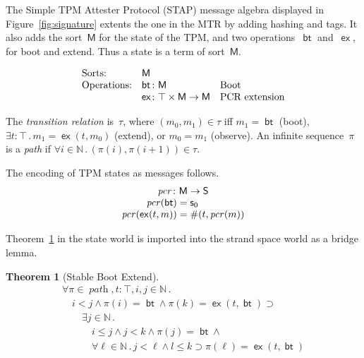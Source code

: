 \documentclass[12pt]{article}
\newtheorem{thm}{Theorem}
\newcommand{\cn}[1]{\ensuremath{\operatorname{\mathsf{#1}}}}
\newcommand{\fn}[1]{\ensuremath{\operatorname{\mathit{#1}}}}
\newcommand{\srt}[1]{\ensuremath{\mathsf{#1}}}
\newcommand{\nat}{\ensuremath{\mathbb{N}}}
\newcommand{\all}[1]{\forall#1\mathpunct.}
\newcommand{\some}[1]{\exists#1\mathpunct.}
\newcommand{\boot}{\cn{bt}}
\newcommand{\tran}{\ensuremath{\tau}}
\newcommand{\pth}{\ensuremath{\pi}}
\begin{document}
The Simple TPM Attester Protocol (STAP) message algebra displayed in
Figure~\ref{fig:signature} extents the one in the MTR by adding
hashing and tags.  It also adds the sort~\srt{M} for the state of the
TPM, and two operations~\cn{bt} and~\cn{ex}, for boot and extend.
Thus a state is a term of sort~\srt{M}.

$$\begin{array}{ll@{{}\colon{}}ll}
\mbox{Sorts:}&\multicolumn{3}{l}{\srt{M}}\\
\mbox{Operations:}&\boot&\srt{M}& \mbox{Boot}\\
&\cn{ex}&\top\times\srt{M}\to\srt{M}&\mbox{PCR extension}
\end{array}$$

The \emph{transition relation} is~$\tran$, where $(m_0,m_1)\in\tran$
iff $m_1=\boot$ (boot), $\some{t\colon\top}m_1=\cn{ex}(t,m_0)$
(extend), or $m_0 = m_1$ (observe).  An infinite sequence~$\pth$ is a
\emph{path} if $\all{i\in\nat}(\pth(i),\pth(i+1))\in\tran$.

The encoding of TPM states as messages follows.
$$\begin{array}{r@{{}={}}l}
\multicolumn{2}{c}{\fn{pcr}\colon\srt{M}\to\srt{S}}\\
\fn{pcr}(\boot)&\cn{s}_0\\
\fn{pcr}(\cn{ex}(t, m))&\#(t,\fn{pcr}(m))
\end{array}$$


Theorem~\ref{thm:stable boot extend} in the state world is
imported into the strand space world as a bridge lemma.
\begin{thm}[Stable Boot Extend]\label{thm:stable boot extend}
$$\begin{array}{l}
\all{\pi\in\fn{path},t\colon\top,i,j\in\nat}\\
\quad i<j\wedge\pi(i)=\boot\wedge\pi(k)=\cn{ex}(t,\boot)\supset{}\\
\qquad\some{j\in\nat}\\
\qquad\quad i\leq j\wedge j<k\wedge\pi(j)=\boot\wedge{}\\
\qquad\quad\all{\ell\in\nat}
j<\ell\wedge l\leq k\supset\pi(\ell)=\cn{ex}(t,\boot)
\end{array}$$
\end{thm}
\end{document}
